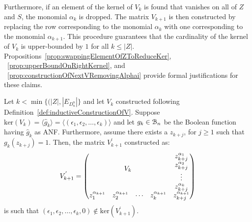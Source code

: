 \documentclass[11pt]{llncs}
\begin{document}
Furthermore, if an element of the kernel of \( V_k \) is found that vanishes on all of \( Z \) and \( S \), the monomial \( \alpha_k \) is dropped. 
The matrix \( V_{k+1} \) is then constructed by replacing the row corresponding to the monomial \( \alpha_k \) with one corresponding to the monomial \( \alpha_{k+1} \).
This procedure guarantees that the cardinality of the kernel of \( V_k \) is upper-bounded by \( 1 \) for all \( k \leq |Z| \).
Propositions~\ref{prop:swappingElementOfZToReduceKer}, ~\ref{prop:upperBoundOnRightKernel}, and ~\ref{prop:constructionOfNextVRemovingAlphai} provide formal justifications for these claims.




\begin{proposition}\label{prop:swappingElementOfZToReduceKer}
    Let $k < \min\{(|Z|, |E_{D_n^n}|\}$ and let $V_k$ constructed following Definition~\ref{def:inductiveConstructionOfV}. 
    Suppose $\text{ker}(V_k) = \langle \hat{g}_k \rangle=\langle (\epsilon_1, \epsilon_2, \dots, \epsilon_k) \rangle $ and let $g_k\in \mathcal{B}_{n}$ be the Boolean function having $\hat{g}_k$ as ANF. 
    Furthermore, assume there exists a $z_{k+j}$, for $j\geq 1$ such that $g_k(z_{k+j}) = 1$. Then, the matrix $V^{'}_{k+1}$ constructed as:
    \begin{align*}
        V^{'}_{k+1} = 
        \begin{pmatrix}
        \multicolumn{4}{c}{\multirow{4}{*}{$V_{k}$}} & z_{k+j}^{\alpha_{1}}\\
        & & & & z_{k+j}^{\alpha_{2}}\\
        & & & & \vdots\\
        & & & & z_{k+j}^{\alpha_{k}}\\
        z_{1}^{\alpha_{k+1}} & z_{2}^{\alpha_{k+1}}& \cdots & z_{k}^{\alpha_{k+1}} & z_{k+j}^{\alpha_{k+1}}
    \end{pmatrix}
    \end{align*}
    is such that $(\epsilon_1, \epsilon_2, \dots, \epsilon_k, 0) \not\in \text{ker}(V^{'}_{k+1})$.
\end{proposition}
\end{document}
